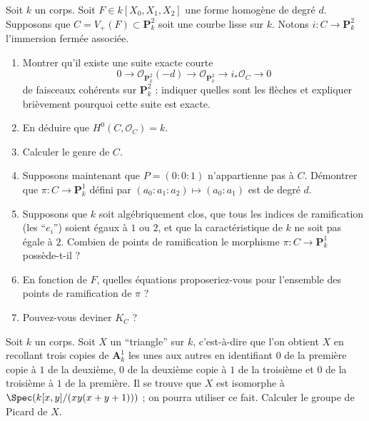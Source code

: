 \begin{exercise}
\label{exercise-genus-plane-curve}
Soit $k$ un corps.
Soit $F \in k[X_0, X_1, X_2]$ une forme homogène de degré $d$.
Supposons que $C = V_{+}(F) \subset \mathbf{P}^2_k$ soit une courbe lisse sur $k$.
Notons $i : C \to \mathbf{P}^2_k$ l'immersion fermée associée.
\begin{enumerate}
\item Montrer qu'il existe une suite exacte courte
$$
0 \to \mathcal{O}_{\mathbf{P}^2_k}(-d)
\to \mathcal{O}_{\mathbf{P}^2_k} \to i_*\mathcal{O}_C \to 0
$$
de faisceaux cohérents sur $\mathbf{P}^2_k$ : indiquer quelles sont les flèches
et expliquer brièvement pourquoi cette suite est exacte.
\item En déduire que $H^0(C, \mathcal{O}_C) = k$.
\item Calculer le genre de $C$.
\item Supposons maintenant que $P = (0 : 0 : 1)$ n'appartienne pas à $C$. Démontrer que
$\pi : C \to \mathbf{P}^1_k$ défini par $(a_0 : a_1 : a_2) \mapsto (a_0 : a_1)$
est de degré $d$.
\item Supposons que $k$ soit algébriquement clos, que tous les indices de ramification
(les ``$e_i$'') soient égaux à $1$ ou $2$, et que la caractéristique de $k$
ne soit pas égale à $2$. Combien de points de ramification
le morphisme $\pi : C \to \mathbf{P}^1_k$ possède-t-il ?
\item En fonction de $F$, quelles équations proposeriez-vous pour
l'ensemble des points de ramification de $\pi$ ?
\item Pouvez-vous deviner $K_C$ ?
\end{enumerate}
\end{exercise}

\begin{exercise}
\label{exercise-Pic-triangle}
Soit $k$ un corps. Soit $X$ un ``triangle'' sur $k$, c'est-à-dire
que l'on obtient $X$ en recollant trois copies de $\mathbf{A}^1_k$ les unes aux autres en
identifiant $0$ de la première copie à $1$ de la deuxième, $0$ de la
deuxième copie à $1$ de la troisième et $0$ de la troisième à $1$ de
la première. Il se trouve que $X$ est isomorphe à
$\Spec(k[x, y]/(xy(x + y + 1)))$ ; on pourra utiliser ce fait.
Calculer le groupe de Picard de $X$.
\end{exercise}

